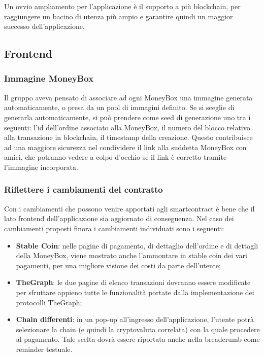 Un ovvio ampliamento per l'applicazione è il supporto a più blockchain, per raggiungere un bacino di utenza più ampio e garantire quindi un maggior successo dell'applicazione.\\


\subsection{Frontend}

\subsubsection{Immagine MoneyBox}

Il gruppo aveva pensato di associare ad ogni MoneyBox una immagine generata automaticamente, o presa da un pool di immagini definito. Se si sceglie di generarla automaticamente, si può prendere come seed di generazione uno tra i seguenti: l'id dell'ordine associato alla MoneyBox, 
il numero del blocco relativo alla transazione in blockchain, il timestamp della creazione.
Questo contribuisce ad una maggiore sicurezza nel condividere il link alla suddetta MoneyBox con amici, che potranno vedere a colpo d'occhio se il link è corretto tramite l'immagine incorporata.

\subsubsection{Riflettere i cambiamenti del contratto}

Con i cambiamenti che possono venire apportati agli smartcontract è bene che il lato frontend dell'applicazione sia aggiornato di conseguenza.
Nel caso dei cambiamenti proposti finora i cambiamenti individuati sono i seguenti:
\begin{itemize}
    \item \textbf{Stable Coin}: nelle pagine di pagamento, di dettaglio dell'ordine e di dettagli della MoneyBox, viene mostrato anche l'ammontare in stable coin dei vari pagamenti, per una migliore visione dei costi da parte dell'utente;
    \item \textbf{TheGraph}: le due pagine di elenco transazioni dovranno essere modificate per sfruttare appieno tutte le funzionalità portate dalla implementazione dei protocolli TheGraph;
    \item \textbf{Chain differenti}:  in un pop-up all'ingresso dell'applicazione, l'utente potrà selezionare la chain (e quindi la cryptovaluta correlata) con la quale procedere al pagamento. Tale scelta dovrà essere riportata anche nella breadcrumb come reminder testuale.
\end{itemize}

